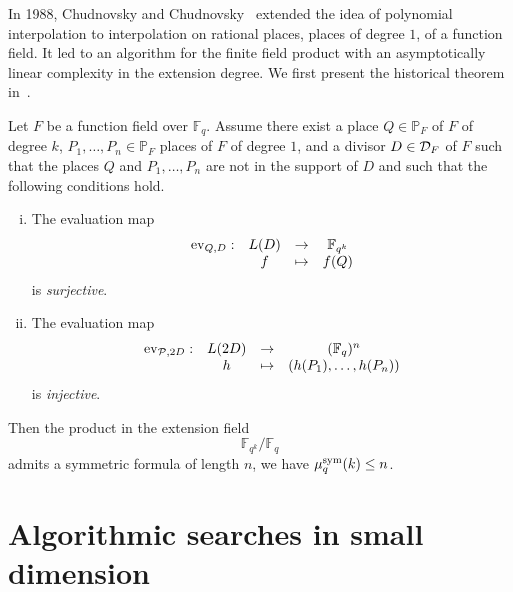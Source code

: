 In 1988, Chudnovsky and Chudnovsky~\cite{CC88} extended the idea of polynomial
interpolation to interpolation on rational places, \ie places of degree $1$, of
a function field. It led to an algorithm for the finite field product with an
asymptotically linear complexity in the extension degree. We first present the historical theorem
in~\cite{CC88}.
\begin{thm}
  \label{thm:CC88}
  Let $F$ be a function field over $\mathbb{F}_q$.
  Assume there exist a place $Q\in\mathbb{P}_{F}$ of $F$ of degree $k$, $P_1,
  \dots, P_n\in\mathbb{P}_F$ places of $F$ of degree $1$, and a divisor
  $D\in\mathcal{D}_F$ of $F$ such that the places $Q$ and $P_1, \dots, P_n$ are not in
  the support of $D$ and such that the following conditions hold.
  \begin{enumerate}[(i)]
    \item \label{cond:1} The evaluation map
      \[
        \begin{array}{cccc}
        \operatorname{ev}_{Q, D}: & L(D) & \to & \mathbb{F}_{q^k}\\
  & f & \mapsto & f(Q)
\end{array}
\]
is \emph{surjective}.
    \item \label{cond:2} The evaluation map
      \[
        \begin{array}{cccc}
        \operatorname{ev}_{\mathcal{P}, 2D}: & L(2D) & \to & (\mathbb{F}_{q})^n\\
  & h & \mapsto & (h(P_1), \dots, h(P_n))
\end{array}
\]
is \emph{injective}.
  \end{enumerate}
  Then the product in the extension field 
  \[
    \mathbb{F}_{q^k}/\mathbb{F}_q
  \]
  admits a symmetric formula of length $n$, \ie we have $\mu^{\textrm{sym}}_q(k)\leq n$.
\end{thm}

\section{Algorithmic searches in small dimension}

%

